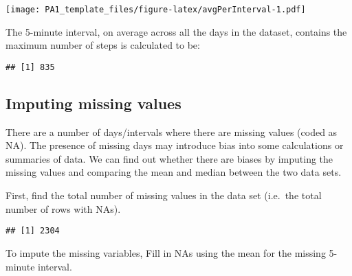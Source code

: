 \documentclass[
]{article}
\newenvironment{Shaded}{\begin{snugshade}}{\end{snugshade}}
\newcommand{\FunctionTok}[1]{\textcolor[rgb]{0.00,0.00,0.00}{#1}}
\newcommand{\NormalTok}[1]{#1}
\newcommand{\OtherTok}[1]{\textcolor[rgb]{0.56,0.35,0.01}{#1}}
\newcommand{\SpecialCharTok}[1]{\textcolor[rgb]{0.00,0.00,0.00}{#1}}
\begin{document}
\texttt{[image: PA1\_template\_files/figure-latex/avgPerInterval-1.pdf]}

The 5-minute interval, on average across all the days in the dataset,
contains the maximum number of steps is calculated to be:

\begin{Shaded}
\end{Shaded}

\begin{verbatim}
## [1] 835
\end{verbatim}

\hypertarget{imputing-missing-values}{%
\subsection{Imputing missing values}\label{imputing-missing-values}}

There are a number of days/intervals where there are missing values
(coded as NA). The presence of missing days may introduce bias into some
calculations or summaries of data. We can find out whether there are
biases by imputing the missing values and comparing the mean and median
between the two data sets.

First, find the total number of missing values in the data set (i.e.~the
total number of rows with NAs).

\begin{Shaded}
\end{Shaded}

\begin{verbatim}
## [1] 2304
\end{verbatim}

To impute the missing variables, Fill in NAs using the mean for the
missing 5-minute interval.
\end{document}
